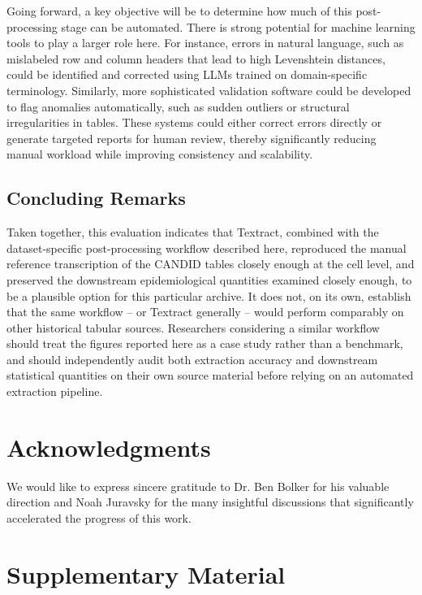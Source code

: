 \documentclass[12pt]{article}
\begin{document}
Going forward, a key objective will be to determine how much of this post-processing stage can be automated. There is strong potential for machine learning tools to play a larger role here. For instance, errors in natural language, such as mislabeled row and column headers that lead to high Levenshtein distances, could be identified and corrected using LLMs trained on domain-specific terminology. Similarly, more sophisticated validation software could be developed to flag anomalies automatically, such as sudden outliers or structural irregularities in tables. These systems could either correct errors directly or generate targeted reports for human review, thereby significantly reducing manual workload while improving consistency and scalability.

\subsection{Concluding Remarks}

Taken together, this evaluation indicates that Textract, combined with the dataset-specific post-processing workflow described here, reproduced the manual reference transcription of the CANDID tables closely enough at the cell level, and preserved the downstream epidemiological quantities examined closely enough, to be a plausible option for this particular archive. It does not, on its own, establish that the same workflow -- or Textract generally -- would perform comparably on other historical tabular sources. Researchers considering a similar workflow should treat the figures reported here as a case study rather than a benchmark, and should independently audit both extraction accuracy and downstream statistical quantities on their own source material before relying on an automated extraction pipeline.



\section*{Acknowledgments}
We would like to express sincere gratitude to Dr. Ben Bolker for his valuable direction and Noah Juravsky for the many insightful discussions that significantly accelerated the progress of this work. 
\clearpage
\printbibliography 

\clearpage
\section*{Supplementary Material}
\label{sec:supp}
\end{document}
